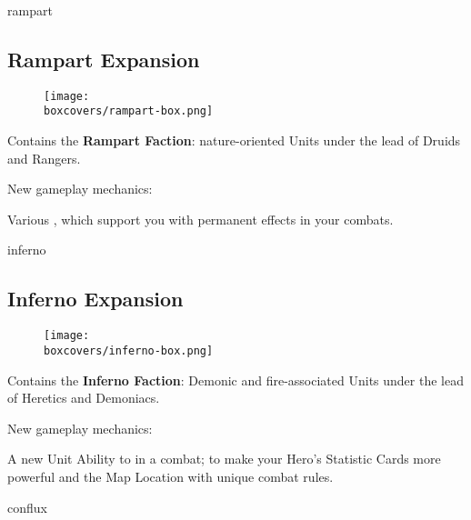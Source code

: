 \begin{multicols}{2}
\columnbreak
\begin{expansion}[title=]{rampart}
    \subsection*{\color{rampart}Rampart Expansion}
    \setlength\intextsep{0pt}
    \setlength\columnsep{0.8em}
    \begin{wrapfigure}{l}{0.35\textwidth}
        \texttt{[image: \\boxcovers/rampart-box.png]}
    \end{wrapfigure}
    Contains the \textbf{Rampart Faction}: nature-oriented Units under the lead of Druids and Rangers.\par
    \medskip
    New gameplay mechanics:\par
    \smallskip
    Various , which support you with permanent effects in your combats.
\end{expansion}

\vspace*{1em}
\begin{expansion}[title=]{inferno}
    \subsection*{\color{inferno}Inferno Expansion}
    \setlength\intextsep{0pt}
    \setlength\columnsep{0.8em}
    \begin{wrapfigure}{l}{0.35\textwidth}
        \texttt{[image: \\boxcovers/inferno-box.png]}
    \end{wrapfigure}
    Contains the \textbf{Inferno Faction}: Demonic and fire-associated Units under the lead of Heretics and Demoniacs.\par
    \medskip
    New gameplay mechanics:\par
    \smallskip
    A new Unit Ability to  in a combat;  to make your Hero's Statistic Cards more powerful and the  Map Location with unique combat rules.
\end{expansion}

\vspace*{1em}
\begin{expansion}[title=]{conflux}

\end{expansion}
\end{multicols}
